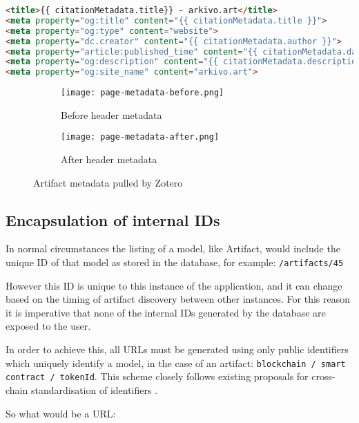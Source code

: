 \begin{lstlisting}[language=HTML, caption={Artifact page metadata}] 
<title>{{ citationMetadata.title}} - arkivo.art</title>
<meta property="og:title" content="{{ citationMetadata.title }}">
<meta property="og:type" content="website">
<meta property="dc.creator" content="{{ citationMetadata.author }}">
<meta property="article:published_time" content="{{ citationMetadata.date }}">
<meta property="og:description" content="{{ citationMetadata.description }}">
<meta property="og:site_name" content="arkivo.art">
\end{lstlisting}


\begin{figure}[H]
  \centering
  \begin{subfigure}[b]{0.45\textwidth}
    \centering
    \texttt{[image: page-metadata-before.png]}
    \caption{Before header metadata}
    \label{fig:image1}
  \end{subfigure}
  \hfill
  \begin{subfigure}[b]{0.45\textwidth}
    \centering
    \texttt{[image: page-metadata-after.png]}
    \caption{After header metadata}
    \label{fig:image2}
  \end{subfigure}
  \caption{Artifact metadata pulled by Zotero}
  \label{fig:zotero-metadata-comparison}
\end{figure}


\subsection{Encapsulation of internal IDs}

In normal circumstances the listing of a model, like Artifact, would include the unique ID of that model as stored in the database, for example: \texttt{/artifacts/45}

However this ID is unique to this instance of the application, and it can change based on the timing of artifact discovery between other instances.
For this reason it is imperative that none of the internal IDs generated by the database are exposed to the user.

In order to achieve this, all URLs must be generated using only public identifiers which uniquely identify a model, in the case of an artifact: \texttt{blockchain /  smart contract / tokenId}.
This scheme closely follows existing proposals for cross-chain standardisation of identifiers \cite{herzogAssetTypeAsset2020}.

So what would be a URL:

